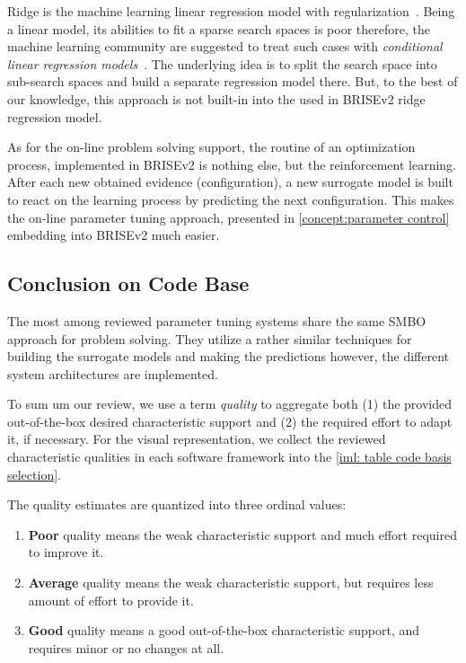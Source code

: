 Ridge is the machine learning linear regression model with regularization~\cite{hoerl1970ridge}. Being a linear model, its abilities to fit a sparse search spaces is poor therefore, the machine learning community are suggested to treat such cases with \emph{conditional linear regression models}~\cite{DBLP:journals/corr/abs-1806-02326}. The underlying idea is to split the search space into sub-search spaces and build a separate regression model there. But, to the best of our knowledge, this approach is not built-in into the used in BRISEv2 ridge regression model.

As for the on-line problem solving support, the routine of an optimization process, implemented in BRISEv2 is nothing else, but the reinforcement learning. After each new obtained evidence (configuration), a new surrogate model is built to react on the learning process by predicting the next configuration. This makes the on-line parameter tuning approach, presented in \cref{concept:parameter control} embedding into BRISEv2 much easier.

\subsection{Conclusion on Code Base}\label{impl:hlh code basis conclusion}
The most among reviewed parameter tuning systems share the same SMBO approach for problem solving. They utilize a rather similar techniques for building the surrogate models and making the predictions however, the different system architectures are implemented.

To sum um our review, we use a term \emph{quality} to aggregate both (1) the provided  out-of-the-box desired characteristic support and (2) the required effort to adapt it, if necessary. For the visual representation, we collect the reviewed characteristic qualities in each software framework into the \cref{iml: table code basis selection}.

The quality estimates are quantized into three ordinal values:
\begin{enumerate}
	\item \textbf{Poor} quality means the weak characteristic support and much effort required to improve it.
	\item \textbf{Average} quality means the weak characteristic support, but requires less amount of effort to provide it.
	\item \textbf{Good} quality means a good out-of-the-box characteristic support, and requires minor or no changes at all.
\end{enumerate}

